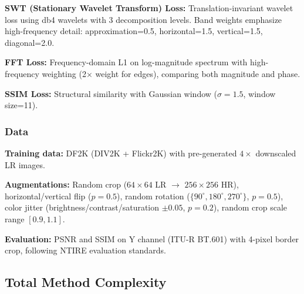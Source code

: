\documentclass[10pt,twocolumn,letterpaper]{article}
\begin{document}
\noindent\textbf{SWT (Stationary Wavelet Transform) Loss:} Translation-invariant wavelet loss using db4 wavelets with 3 decomposition levels. Band weights emphasize high-frequency detail: approximation=0.5, horizontal=1.5, vertical=1.5, diagonal=2.0.

\noindent\textbf{FFT Loss:} Frequency-domain L1 on log-magnitude spectrum with high-frequency weighting (2$\times$ weight for edges), comparing both magnitude and phase.

\noindent\textbf{SSIM Loss:} Structural similarity with Gaussian window ($\sigma=1.5$, window size=11).

\subsubsection{Data}

\noindent\textbf{Training data:} DF2K (DIV2K + Flickr2K) with pre-generated $4\times$ downscaled LR images.

\noindent\textbf{Augmentations:} Random crop ($64\times 64$ LR $\to$ $256\times 256$ HR), horizontal/vertical flip ($p=0.5$), random rotation ($\{90^\circ, 180^\circ, 270^\circ\}$, $p=0.5$), color jitter (brightness/contrast/saturation $\pm 0.05$, $p=0.2$), random crop scale range $[0.9, 1.1]$.

\noindent\textbf{Evaluation:} PSNR and SSIM on Y channel (ITU-R BT.601) with 4-pixel border crop, following NTIRE evaluation standards.

\subsection{Total Method Complexity}
\end{document}

